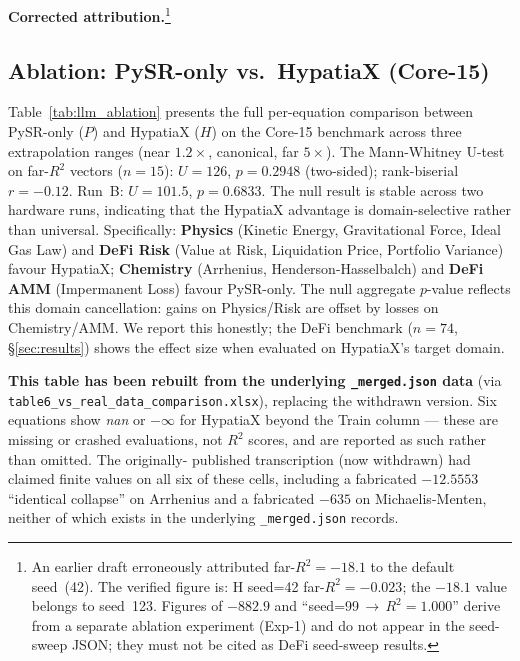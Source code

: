\documentclass[twoside,11pt]{article}
\newcommand{\Rsq}{R^{2}}
\begin{document}
\textbf{Corrected attribution.}\footnote{An earlier draft erroneously attributed
far-$\Rsq=-18.1$ to the default seed~(42).  The verified figure is: H seed=42
far-$\Rsq=-0.023$; the $-18.1$ value belongs to seed~123.  Figures of $-882.9$ and
``seed=99\,$\to$\,$\Rsq=1.000$'' derive from a separate ablation experiment (Exp-1)
and do not appear in the seed-sweep JSON; they must not be cited as DeFi seed-sweep
results.}

\subsection{Ablation: PySR-only vs.\ HypatiaX (Core-15)}\label{subsec:ablation-pysronly-vs-hypatiax-core15}
\label{sec:ablation_core15}

Table~\ref{tab:llm_ablation} presents the full per-equation comparison between
PySR-only ($P$) and HypatiaX ($H$) on the Core-15 benchmark across three
extrapolation ranges (near $1.2\times$, canonical, far $5\times$).  The
Mann-Whitney U-test on far-$\Rsq$ vectors ($n=15$): $U=126$, $p=0.2948$
(two-sided); rank-biserial $r=-0.12$.  Run~B: $U=101.5$, $p=0.6833$.
The null result is stable across two hardware runs, indicating that the
HypatiaX advantage is domain-selective rather than universal.  Specifically:
\textbf{Physics} (Kinetic Energy, Gravitational Force, Ideal Gas Law) and
\textbf{DeFi Risk} (Value at Risk, Liquidation Price, Portfolio Variance) favour
HypatiaX; \textbf{Chemistry} (Arrhenius, Henderson-Hasselbalch) and
\textbf{DeFi AMM} (Impermanent Loss) favour PySR-only.  The null aggregate
$p$-value reflects this domain cancellation: gains on Physics/Risk are offset by
losses on Chemistry/AMM.  We report this honestly; the DeFi benchmark
($n=74$, §\ref{sec:results}) shows the effect size when evaluated on
HypatiaX's target domain.

\textbf{This table has been rebuilt from the underlying \texttt{\_merged.json}
data} (via \texttt{table6\_vs\_real\_data\_comparison.xlsx}), replacing the
withdrawn version. Six equations show \textit{nan} or $-\infty$ for HypatiaX
beyond the Train column --- these are missing or crashed evaluations, not
$\Rsq$ scores, and are reported as such rather than omitted. The originally-
published transcription (now withdrawn) had claimed finite values on all six
of these cells, including a fabricated $-12.5553$ ``identical collapse'' on
Arrhenius and a fabricated $-635$ on Michaelis-Menten, neither of which
exists in the underlying \texttt{\_merged.json} records.
\end{document}
